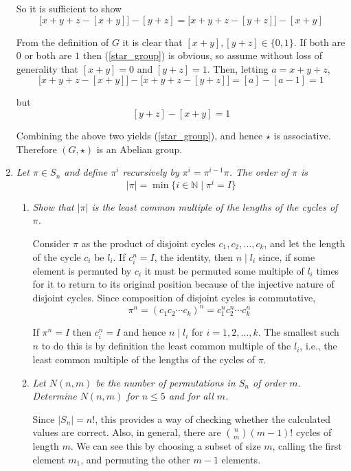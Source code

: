 \documentclass[letterpaper, 11pt]{article}
\begin{document}
\begin{enumerate}
So it is sufficient to show
\begin{equation}
\label{star_group}
\big[x+y+z - [x+y]\big] - [y+z] = \big[x+y+z - [y+z]\big] - [x+y]
\end{equation}

From the definition of $G$ it is clear that $[x+y], [y+z] \in \{0,1\}$.  If both are $0$ or both are $1$ then (\ref{star_group}) is obvious, so assume without loss of generality that $[x+y] = 0$ and $[y+z] = 1$.  Then, letting $a = x+y+z$, 
\[
\big[x+y+z - [x+y]\big] - \big[x+y+z - [y+z]\big] = [a] - [a-1]= 1
\]

but
\[
[y+z] - [x+y] = 1
\]

Combining the above two yields (\ref{star_group}), and hence $\star$ is associative.  Therefore $(G, \star)$ is an Abelian group.

\item \emph{Let $\pi \in S_n$ and define $\pi^i$ recursively by $\pi^i = \pi^{i-1}\pi$.  The order of $\pi$ is $$|\pi| = \min\{i \in \mathbb{N} \mid \pi^i = I\}$$}
\begin{enumerate}
\item \emph{Show that $|\pi|$ is the least common multiple of the lengths of the cycles of $\pi$.}

Consider $\pi$ as the product of disjoint cycles $c_1, c_2, \ldots, c_k$, and let the length of the cycle $c_i$ be $l_i$.  If $c_i^n = I$, the identity, then $n \mid l_i$ since, if some element is permuted by $c_i$ it must be permuted some multiple of $l_i$ times for it to return to its original position because of the injective nature of disjoint cycles.  Since composition of disjoint cycles is commutative,
\[
\pi^n = (c_1c_2 \cdots c_k)^n = c_1^nc_2^n \cdots c_k^n
\]

If $\pi^n = I$ then $c_i^n = I$ and hence $n \mid l_i$ for $i=1,2,\ldots,k$.  The smallest such $n$ to do this is by definition the least common multiple of the $l_i$, i.e., the least common multiple of the lengths of the cycles of $\pi$.

\item \emph{Let $N(n,m)$ be the number of permutations in $S_n$ of order $m$.  Determine $N(n,m)$ for $n \leq 5$ and for all $m$.}

Since $\left|S_n\right| = n!$, this provides a way of checking whether the calculated values are correct.  Also, in general, there are $\binom{n}{m}(m-1)!$ cycles of length $m$.  We can see this by choosing a subset of size $m$, calling the first element $m_1$, and permuting the other $m-1$ elements.


\end{enumerate}
\end{enumerate}
\end{document}
